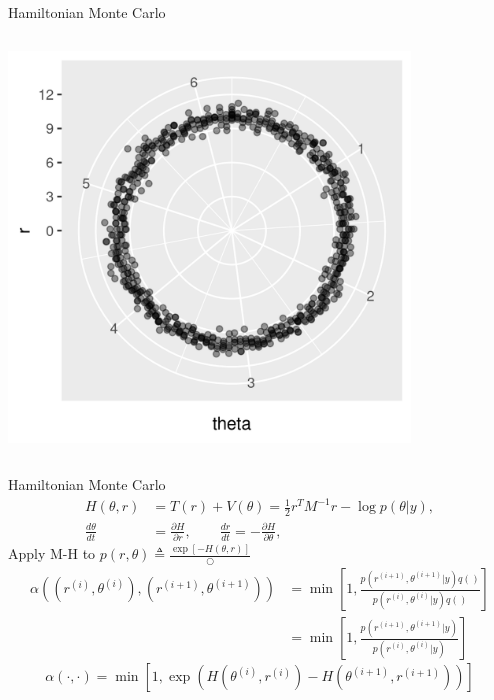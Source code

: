 \documentclass[bigger]{beamer}
\begin{document}
\begin{frame}[label={sec:org5162287}]{Hamiltonian Monte Carlo}
\begin{columns}
\begin{column}{0.5\columnwidth}
\begin{center}
\includegraphics[width=0.8\textwidth]{./figure/d100_normal_point.png}
\end{center}
\end{column}
\end{columns}
\end{frame}


\begin{frame}[label={sec:orgdc156e3}]{Hamiltonian Monte Carlo}
\begin{align*}
  H(\theta, r) &= T(r) + V(\theta) = \frac{1}{2}r^TM^{-1}r - \log{p(\theta|y)},\\
  \frac{d\theta}{dt} &= \frac{\partial H}{\partial r},\qquad
  \frac{dr}{dt} = -\frac{\partial H}{\partial \theta},
\end{align*}
Apply M-H to \(p(r, \theta) \triangleq \frac{\exp{[-H(\theta, r)]}}{\bigcirc}\)
\begin{align*}
  \alpha((r^{(i)}, \theta^{(i)}), (r^{(i+1)}, \theta^{(i+1)})) &= \min\left[
    1, \frac{p(r^{(i+1)}, \theta^{(i+1)}|y)q()}{p(r^{(i)}, \theta^{(i)}|y)q()}
  \right]\\
  &= \min\left[
    1, \frac{p(r^{(i+1)}, \theta^{(i+1)}|y)}{p(r^{(i)}, \theta^{(i)}|y)}
  \right]
\end{align*}
\begin{equation*}
  \alpha(\cdot, \cdot) =\min\left[
    1, \exp{(H(\theta^{(i)}, r^{(i)}) - H(\theta^{(i+1)}, r^{(i+1)}))}
  \right]
\end{equation*}
\end{frame}
\end{document}
